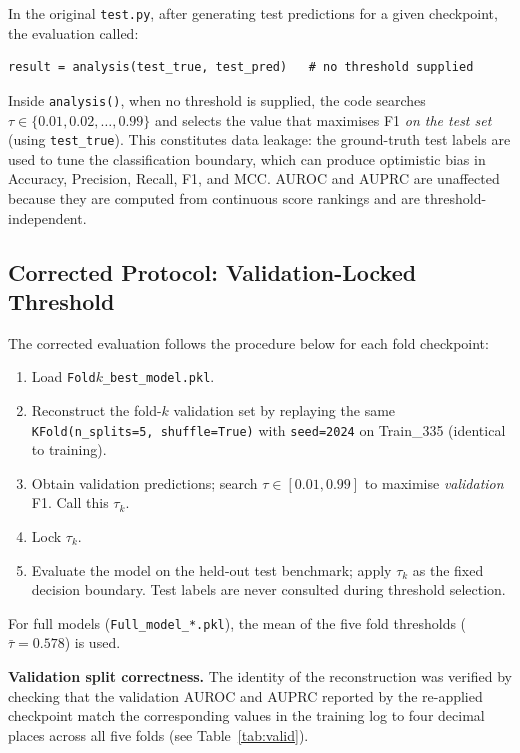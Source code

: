 \documentclass[11pt,a4paper]{article}
\begin{document}
In the original \texttt{test.py}, after generating test predictions for a given
checkpoint, the evaluation called:
\begin{verbatim}
result = analysis(test_true, test_pred)   # no threshold supplied
\end{verbatim}
Inside \texttt{analysis()}, when no threshold is supplied, the code searches
$\tau \in \{0.01, 0.02, \ldots, 0.99\}$ and selects the value that maximises F1
\emph{on the test set} (using \texttt{test\_true}). This constitutes data leakage:
the ground-truth test labels are used to tune the classification boundary, which can
produce optimistic bias in Accuracy, Precision, Recall, F1, and MCC. AUROC and
AUPRC are unaffected because they are computed from continuous score rankings and
are threshold-independent.

\subsection{Corrected Protocol: Validation-Locked Threshold}
\label{sec:protocol}

The corrected evaluation follows the procedure below for each fold checkpoint:

\begin{enumerate}
    \item Load \texttt{Fold}$k$\texttt{\_best\_model.pkl}.
    \item Reconstruct the fold-$k$ validation set by replaying the same
          \texttt{KFold(n\_splits=5, shuffle=True)} with \texttt{seed=2024}
          on Train\_335 (identical to training).
    \item Obtain validation predictions; search $\tau \in [0.01, 0.99]$
          to maximise \emph{validation} F1. Call this $\tau_k$.
    \item Lock $\tau_k$.
    \item Evaluate the model on the held-out test benchmark; apply $\tau_k$
          as the fixed decision boundary. Test labels are never consulted
          during threshold selection.
\end{enumerate}
For full models (\texttt{Full\_model\_*.pkl}), the mean of the five fold thresholds
($\bar{\tau} = 0.578$) is used.

\noindent\textbf{Validation split correctness.} The identity of the reconstruction
was verified by checking that the validation AUROC and AUPRC reported by the
re-applied checkpoint match the corresponding values in the training log to four
decimal places across all five folds (see Table~\ref{tab:valid}).
\end{document}
